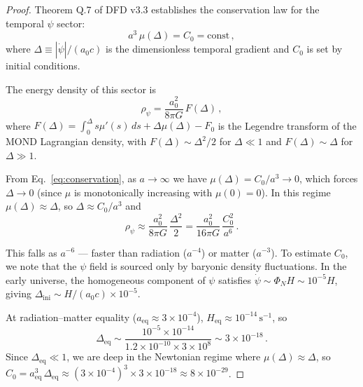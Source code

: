 \documentclass[12pt,a4paper]{article}
\begin{document}
\begin{proof}
Theorem Q.7 of DFD v3.3 establishes the conservation law for the
temporal $\psi$ sector:
\begin{equation}
\label{eq:conservation}
a^3\,\mu(\Delta) = C_0 = \mathrm{const}\,,
\end{equation}
where $\Delta \equiv |\dot{\psi}|/(a_0 c)$ is the dimensionless
temporal gradient and $C_0$ is set by initial conditions.

The energy density of this sector is
\begin{equation}
\rho_\psi = \frac{a_0^2}{8\pi G}\,F(\Delta)\,,
\end{equation}
where $F(\Delta) = \int_0^\Delta s\mu'(s)\,ds + \Delta\mu(\Delta) - F_0$
is the Legendre transform of the MOND Lagrangian density, with
$F(\Delta) \sim \Delta^2/2$ for $\Delta \ll 1$ and
$F(\Delta) \sim \Delta$ for $\Delta \gg 1$.

From Eq.~\eqref{eq:conservation}, as $a \to \infty$ we have
$\mu(\Delta) = C_0/a^3 \to 0$, which forces $\Delta \to 0$
(since $\mu$ is monotonically increasing with $\mu(0) = 0$).
In this regime $\mu(\Delta) \approx \Delta$, so
$\Delta \approx C_0/a^3$ and
\begin{equation}
\rho_\psi \approx \frac{a_0^2}{8\pi G}\,\frac{\Delta^2}{2}
= \frac{a_0^2}{16\pi G}\,\frac{C_0^2}{a^6}\,.
\end{equation}

This falls as $a^{-6}$ --- faster than radiation ($a^{-4}$) or matter
($a^{-3}$). To estimate $C_0$, we note that the $\psi$ field is sourced
only by baryonic density fluctuations. In the early universe, the
homogeneous component of $\psi$ satisfies
$\dot{\psi} \sim \Phi_N H \sim 10^{-5} H$, giving
$\Delta_{\mathrm{ini}} \sim H/(a_0 c) \times 10^{-5}$.

At radiation--matter equality ($a_{\mathrm{eq}} \approx 3 \times 10^{-4}$),
$H_{\mathrm{eq}} \approx 10^{-14}\,\mathrm{s}^{-1}$, so
\begin{equation}
\Delta_{\mathrm{eq}} \sim \frac{10^{-5} \times 10^{-14}}{1.2\times 10^{-10}
\times 3\times 10^8} \sim 3 \times 10^{-18}\,.
\end{equation}
Since $\Delta_{\mathrm{eq}} \ll 1$, we are deep in the Newtonian regime
where $\mu(\Delta) \approx \Delta$, so
$C_0 = a_{\mathrm{eq}}^3\,\Delta_{\mathrm{eq}}
\approx (3\times 10^{-4})^3 \times 3\times 10^{-18}
\approx 8 \times 10^{-29}$.


\end{proof}
\end{document}
